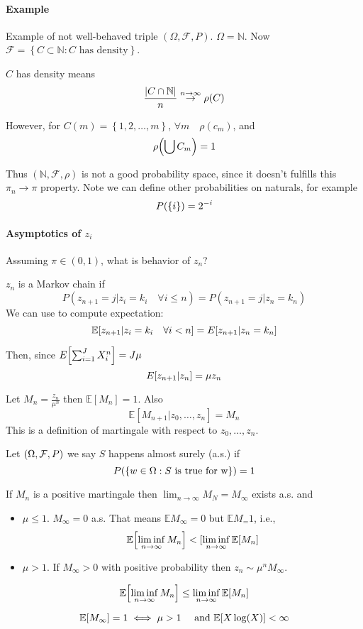


\paragraph{Example}
Example of not well-behaved triple $(\Omega, \mathcal{F}, P)$. $\Omega =\mathbb{N}$. Now $\mathcal{F} = \left\{  C\subset \mathbb{N} : C \text{ has density} \right\}$.

$C$ has density means 
$$\frac{\abs{C \cap \mathbb{N}}}{n} \stackrel{n\to \infty}{\to} \rho(C)$$

However, for $C(m) = \left\{  1,2,\dots, m \right\}$, $\forall m \quad \rho(c_m)$, and 
$$\rho\qty(\bigcup C_m ) = 1$$

Thus $(\mathbb{N}, \mathcal{F}, \rho)$ is not a good probability space, since it doesn't fulfills this
$\pi_n\to \pi$ property. Note we can define other probabilities on naturals, for example
$$P\qty(\left\{ i \right\}) = 2^{-i}$$


\paragraph{Asymptotics of $z_i$ }
Assuming $\pi \in (0,1)$, what is behavior of $z_n$?
\begin{definition}
	$z_n$ is a Markov chain if 
	$$P(z_{n+1}=j|z_i=k_i \quad \forall i\leq n) = P(z_{n+1} = j | z_n=k_n)$$
	We can use to compute expectation:
	$$\mathbb{E}[z_{n+1}|z_i=k_i \quad \forall i<n] = E\qty[z_{n+1}|z_n=k_n]$$
\end{definition}

Then, since $E\qty[\sum_{i=1}^J X_i^n] = J\mu$
$$E\qty[z_{n+1}|z_n] = \mu z_n$$

Let $M_n = \frac{z_n}{\mu^n}$ then $\mathbb{E}[M_n] = 1$. Also
$$\mathbb{E}[M_{n+1}|z_0,\dots, z_n] = M_n$$
This is a definition of martingale with respect to $z_0, \dots, z_n$.

Let $\qty(\Omega, \mathcal{F}, P)$ we say $S$ happens almost surely (a.s.) if $$P\qty(\left\{ w\in \Omega : S \text{ is true for w} \right\}) = 1$$
\begin{theorem}
	If $M_n$ is a positive martingale then $\lim_{n\to \infty} M_N=M_\infty$ exists a.s. and 
	\begin{itemize}
		\item $\mu \leq 1$. $M_\infty =0 $ a.s. That means $\mathbb{E}M_\infty = 0$ but $\mathbb{E} M_ = 1$, i.e., 
		$$\mathbb{E}\qty[\liminf_{n\to \infty} M_n] < [\liminf_{n\to \infty} \mathbb{E}\qty[M_n]$$ 
		\item $\mu>1$. If $M_\infty > 0$ with positive probability then $z_n \sim \mu^n M_\infty$.  
	\end{itemize}
\end{theorem}


\begin{lemma} 
	$$\mathbb{E}\qty[\liminf_{n\to \infty} M_n] \leq \liminf_{n\to \infty} \mathbb{E}\qty[M_n]$$ 
\end{lemma}

\begin{theorem}
	$$\mathbb{E} \qty[M_\infty] = 1 \iff \mu>1 \quad \text{ and } \mathbb{E}\qty[X \log(X)] < \infty$$
\end{theorem}
